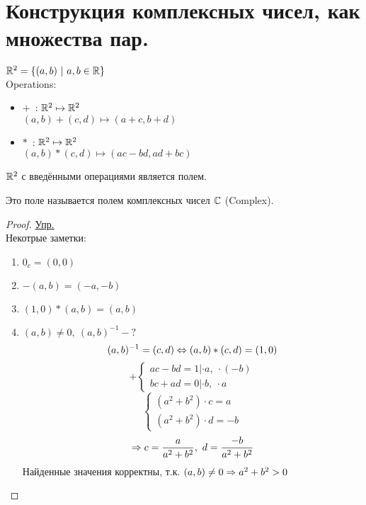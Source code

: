 \section{Конструкция комплексных чисел, как множества пар.}


\begin{flushleft}
$\mathbb{R}^2 = \{(a, b)~|~a, b \in \mathbb{R}\}$ \\
Operations:
\begin{itemize} 
\item $+$~: $\mathbb{R}^2 \mapsto \mathbb{R}^2$ \\
$(a, b) + (c, d) \mapsto (a + c, b + d) $
\item $*$~: $\mathbb{R}^2 \mapsto \mathbb{R}^2$ \\
$(a, b)*(c, d) \mapsto (ac - bd, ad + bc)$
\end{itemize}
\begin{theorem}{}
	$\mathbb{R}^2$ с введёнными операциями является полем.
\end{theorem}
\begin{Def}
	Это поле называется полем комплексных чисел $\mathbb{C}$ (Complex).
\end{Def}
\begin{proof}
	\underline{Упр.} \\
	Некотрые заметки:
	\begin{enumerate}
	\item $0_c = (0, 0)$
	\item $-(a, b) = (-a, -b) $
	\item $(1, 0) * (a, b) = (a, b) $
	\item$ (a, b) \ne 0,~(a, b)^{-1}-?$ \\
	$$(a, b)^{-1} = (c, d) \Leftrightarrow (a, b)*(c, d) = (1, 0)$$
	$$
	+\begin{cases}
	ac - bd = 1 | \cdot a,~\cdot (-b) \\
	bc + ad = 0 | \cdot b,~\cdot a 
	\end{cases}
	$$
	$$
	\begin{cases}
	(a^2 + b^2) \cdot c = a \\
	(a^2 + b^2) \cdot d = -b
	\end{cases}
	$$
	$$ \Rightarrow c = \frac{a}{a^2 + b^2},~d = \frac{-b}{a^2 + b^2}$$
	Найденные значения корректны, т.к. $(a, b) \ne 0 \Rightarrow a^2 + b^2 > 0$
	\end{enumerate}
\end{proof}

\end{flushleft}
